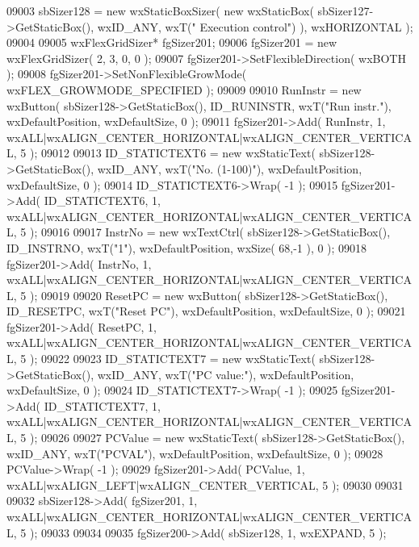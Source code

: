 \begin{DoxyCode}
09003     sbSizer128 = \textcolor{keyword}{new} wxStaticBoxSizer( \textcolor{keyword}{new} wxStaticBox( sbSizer127->GetStaticBox(), wxID\_ANY, wxT(\textcolor{stringliteral}{"
      Execution control"}) ), wxHORIZONTAL );
09004     
09005     wxFlexGridSizer* fgSizer201;
09006     fgSizer201 = \textcolor{keyword}{new} wxFlexGridSizer( 2, 3, 0, 0 );
09007     fgSizer201->SetFlexibleDirection( wxBOTH );
09008     fgSizer201->SetNonFlexibleGrowMode( wxFLEX\_GROWMODE\_SPECIFIED );
09009     
09010     RunInstr = \textcolor{keyword}{new} wxButton( sbSizer128->GetStaticBox(), ID_RUNINSTR, wxT(\textcolor{stringliteral}{"Run instr."}), wxDefaultPosition,
       wxDefaultSize, 0 );
09011     fgSizer201->Add( RunInstr, 1, wxALL|wxALIGN\_CENTER\_HORIZONTAL|wxALIGN\_CENTER\_VERTICAL, 5 );
09012     
09013     ID_STATICTEXT6 = \textcolor{keyword}{new} wxStaticText( sbSizer128->GetStaticBox(), wxID\_ANY, wxT(\textcolor{stringliteral}{"No. (1-100)"}), 
      wxDefaultPosition, wxDefaultSize, 0 );
09014     ID_STATICTEXT6->Wrap( -1 );
09015     fgSizer201->Add( ID_STATICTEXT6, 1, wxALL|wxALIGN\_CENTER\_HORIZONTAL|wxALIGN\_CENTER\_VERTICAL, 5 );
09016     
09017     InstrNo = \textcolor{keyword}{new} wxTextCtrl( sbSizer128->GetStaticBox(), ID_INSTRNO, wxT(\textcolor{stringliteral}{"1"}), wxDefaultPosition, wxSize( 
      68,-1 ), 0 );
09018     fgSizer201->Add( InstrNo, 1, wxALL|wxALIGN\_CENTER\_HORIZONTAL|wxALIGN\_CENTER\_VERTICAL, 5 );
09019     
09020     ResetPC = \textcolor{keyword}{new} wxButton( sbSizer128->GetStaticBox(), ID_RESETPC, wxT(\textcolor{stringliteral}{"Reset PC"}), wxDefaultPosition, 
      wxDefaultSize, 0 );
09021     fgSizer201->Add( ResetPC, 1, wxALL|wxALIGN\_CENTER\_HORIZONTAL|wxALIGN\_CENTER\_VERTICAL, 5 );
09022     
09023     ID_STATICTEXT7 = \textcolor{keyword}{new} wxStaticText( sbSizer128->GetStaticBox(), wxID\_ANY, wxT(\textcolor{stringliteral}{"PC value:"}), 
      wxDefaultPosition, wxDefaultSize, 0 );
09024     ID_STATICTEXT7->Wrap( -1 );
09025     fgSizer201->Add( ID_STATICTEXT7, 1, wxALL|wxALIGN\_CENTER\_HORIZONTAL|wxALIGN\_CENTER\_VERTICAL, 5 );
09026     
09027     PCValue = \textcolor{keyword}{new} wxStaticText( sbSizer128->GetStaticBox(), wxID\_ANY, wxT(\textcolor{stringliteral}{"PCVAL"}), wxDefaultPosition, 
      wxDefaultSize, 0 );
09028     PCValue->Wrap( -1 );
09029     fgSizer201->Add( PCValue, 1, wxALL|wxALIGN\_LEFT|wxALIGN\_CENTER\_VERTICAL, 5 );
09030     
09031     
09032     sbSizer128->Add( fgSizer201, 1, wxALL|wxALIGN\_CENTER\_HORIZONTAL|wxALIGN\_CENTER\_VERTICAL, 5 );
09033     
09034     
09035     fgSizer200->Add( sbSizer128, 1, wxEXPAND, 5 );

\end{DoxyCode}
